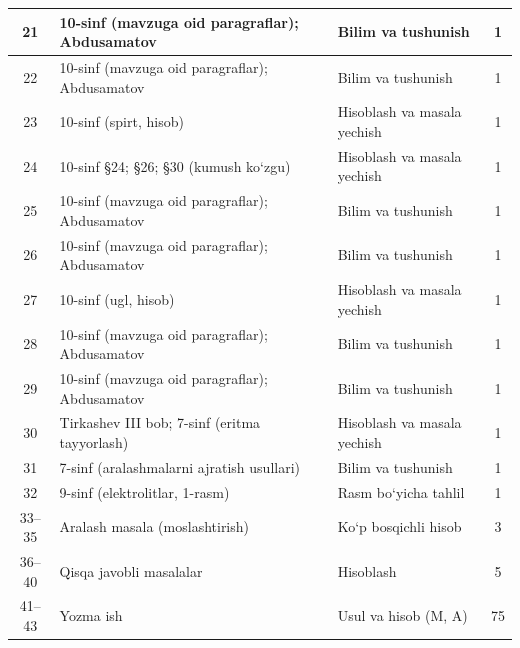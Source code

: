 \documentclass[11pt,a4paper]{article}
\begin{document}
{\begin{longtable}{|c|p{7.2cm}|p{5.4cm}|c|}
21 & 10-sinf (mavzuga oid paragraflar); Abdusamatov & Bilim va tushunish & 1\\\hline
22 & 10-sinf (mavzuga oid paragraflar); Abdusamatov & Bilim va tushunish & 1\\\hline
23 & 10-sinf (spirt, hisob) & Hisoblash va masala yechish & 1\\\hline
24 & 10-sinf \S{}24; \S{}26; \S{}30 (kumush ko`zgu) & Hisoblash va masala yechish & 1\\\hline
25 & 10-sinf (mavzuga oid paragraflar); Abdusamatov & Bilim va tushunish & 1\\\hline
26 & 10-sinf (mavzuga oid paragraflar); Abdusamatov & Bilim va tushunish & 1\\\hline
27 & 10-sinf (ugl, hisob) & Hisoblash va masala yechish & 1\\\hline
28 & 10-sinf (mavzuga oid paragraflar); Abdusamatov & Bilim va tushunish & 1\\\hline
29 & 10-sinf (mavzuga oid paragraflar); Abdusamatov & Bilim va tushunish & 1\\\hline
30 & Tirkashev III bob; 7-sinf (eritma tayyorlash) & Hisoblash va masala yechish & 1\\\hline
31 & 7-sinf (aralashmalarni ajratish usullari) & Bilim va tushunish & 1\\\hline
32 & 9-sinf (elektrolitlar, 1-rasm) & Rasm bo`yicha tahlil & 1\\\hline
33--35 & Aralash masala (moslashtirish) & Ko`p bosqichli hisob & 3\\\hline
36--40 & Qisqa javobli masalalar & Hisoblash & 5\\\hline
41--43 & Yozma ish & Usul va hisob (M, A) & 75\\\hline
\end{longtable}}
\end{document}
